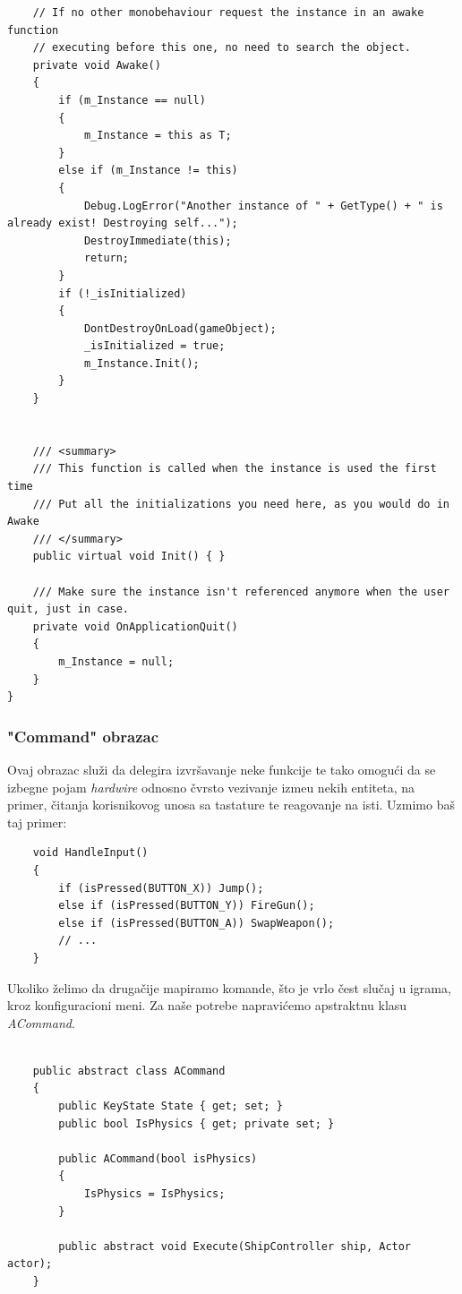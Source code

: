 \begin{verbatim}
    // If no other monobehaviour request the instance in an awake function
    // executing before this one, no need to search the object.
    private void Awake()
    {
        if (m_Instance == null)
        {
            m_Instance = this as T;
        }
        else if (m_Instance != this)
        {
            Debug.LogError("Another instance of " + GetType() + " is already exist! Destroying self...");
            DestroyImmediate(this);
            return;
        }
        if (!_isInitialized)
        {
            DontDestroyOnLoad(gameObject);
            _isInitialized = true;
            m_Instance.Init();
        }
    }


    /// <summary>
    /// This function is called when the instance is used the first time
    /// Put all the initializations you need here, as you would do in Awake
    /// </summary>
    public virtual void Init() { }

    /// Make sure the instance isn't referenced anymore when the user quit, just in case.
    private void OnApplicationQuit()
    {
        m_Instance = null;
    }
}
\end{verbatim}

\subsubsection{"Command" obrazac}
Ovaj obrazac slu\v{z}i da delegira izvr\v{s}avanje neke funkcije te tako omogu\'ci da se izbegne 
pojam \emph{hardwire} odnosno \v{c}vrsto vezivanje izme\dj u nekih entiteta, na primer, \v{c}itanja 
korisnikovog unosa sa tastature te reagovanje na isti. Uzmimo ba\v{s} taj primer:

\begin{verbatim}
    void HandleInput()
    {
        if (isPressed(BUTTON_X)) Jump();
        else if (isPressed(BUTTON_Y)) FireGun();
        else if (isPressed(BUTTON_A)) SwapWeapon();
        // ...
    }
\end{verbatim}

Ukoliko \v{z}elimo da druga\v{c}ije mapiramo komande, \v{s}to je vrlo \v{c}est slu\v{c}aj u igrama, 
kroz konfiguracioni meni. Za na\v{s}e potrebe napravi\'cemo apstraktnu klasu \emph{ACommand}.

\begin{verbatim}
    
    public abstract class ACommand
    {
        public KeyState State { get; set; }
        public bool IsPhysics { get; private set; }

        public ACommand(bool isPhysics)
        {
            IsPhysics = IsPhysics;
        }

        public abstract void Execute(ShipController ship, Actor actor);
    }
\end{verbatim}

